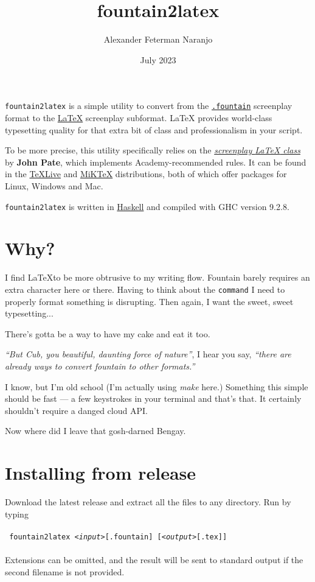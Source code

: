 \documentclass[11pt]{article}
\author{Alexander Feterman Naranjo}
\date{July 2023}
\title{fountain2latex}
\newcommand{\link}[2]{\textcolor{Blue}{\href{#1}{#2}}}
\begin{document}
\maketitle


\texttt{fountain2latex} is a simple utility to convert from the
\texttt{\link{https://fountain.io/}{.fountain}} screenplay format to
the \link{https://www.latex-project.org/}{\LaTeX} screenplay subformat.
{\LaTeX} provides world-class typesetting quality for that extra bit of
class and professionalism in your script.

To be more precise, this utility specifically relies on the
\emph{\link{https://www.ctan.org/pkg/screenplay}{screenplay {\LaTeX} class}}
by \textbf{John Pate}, which implements Academy-recommended rules. It can be
found in the \link{https://tug.org/texlive/}{TeXLive} and
\link{https://miktex.org/}{MiKTeX} distributions, both of which offer
packages for Linux, Windows and Mac.

\texttt{fountain2latex} is written in \link{https://haskell.org}{Haskell}
and compiled with GHC version 9.2.8.


\section*{Why?}

I find \LaTeX to be more obtrusive to my writing flow. Fountain barely
requires an extra character here or there. Having to think about the
\texttt{command} I need to properly format something is disrupting.
Then again, I want the sweet, sweet typesetting...

There's gotta be a way to have my cake and eat it too.

\emph{``But Cub, you beautiful, daunting force of nature''}, I hear you say,
\emph{``there are already ways to convert fountain to other formats.''}

I know, but I'm old school (I'm actually using \emph{make} here.)
Something this simple should be fast --- a few keystrokes in your
terminal and that's that. It certainly shouldn't require a danged
cloud API.

Now where did I leave that gosh-darned Bengay.


\section*{Installing from release}

Download the latest release and extract all the files to any directory.
Run by typing\\
\\
\texttt{    fountain2latex \emph{<input>}[.fountain] [\emph{<output>}[.tex]]}\\
\\
Extensions can be omitted, and the result will be sent to standard
output if the second filename is not provided.
\end{document}
